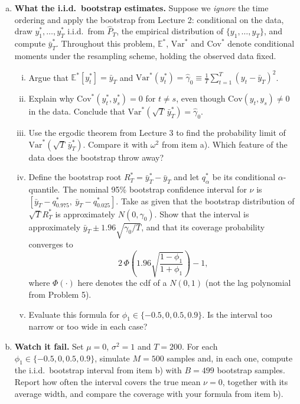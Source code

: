 \documentclass[11pt]{article}
\theoremstyle{definition}
\newcommand{\E}{\mathbb{E}}
\newcommand{\Var}{\mathrm{Var}}
\newcounter{problem}
\begin{document}
\begin{enumerate}[a)]
	\item \textbf{What the i.i.d.\ bootstrap estimates.} Suppose we \textit{ignore} the time ordering and apply the bootstrap from Lecture 2: conditional on the data, draw $y^*_1, \dots, y^*_T$ i.i.d.\ from $\hat{P}_T$, the empirical distribution of $\{y_1, \dots, y_T\}$, and compute $\bar{y}^*_T$. Throughout this problem, $\E^*$, $\Var^*$ and $\mathrm{Cov}^*$ denote conditional moments under the resampling scheme, holding the observed data fixed.
	\begin{enumerate}[(i)]
		\item Argue that $\E^*[y^*_t] = \bar{y}_T$ and $\Var^*(y^*_t) = \hat{\gamma}_0 \equiv \frac{1}{T}\sum_{t=1}^T (y_t - \bar{y}_T)^2$.
		\item Explain why $\mathrm{Cov}^*(y^*_t, y^*_s) = 0$ for $t \neq s$, even though $\mathrm{Cov}(y_t, y_s) \neq 0$ in the data. Conclude that $\Var^*(\sqrt{T}\,\bar{y}^*_T) = \hat{\gamma}_0$.
		\item Use the ergodic theorem from Lecture 3 to find the probability limit of $\Var^*(\sqrt{T}\,\bar{y}^*_T)$. Compare it with $\omega^2$ from item a). Which feature of the data does the bootstrap throw away?
		\item Define the bootstrap root $R_T^* = \bar{y}_T^* - \bar{y}_T$ and let $q_\alpha^*$ be its conditional $\alpha$-quantile. The nominal 95\% bootstrap confidence interval for $\nu$ is $\left[\bar{y}_T - q_{0.975}^*,\ \bar{y}_T - q_{0.025}^*\right]$. Take as given that the bootstrap distribution of $\sqrt{T}R_T^*$ is approximately $N(0, \gamma_0)$. Show that the interval is approximately $\bar{y}_T \pm 1.96\sqrt{\gamma_0/T}$, and that its coverage probability converges to
		\begin{equation*}
			2\,\Phi\left(1.96\sqrt{\frac{1-\phi_1}{1+\phi_1}}\right) - 1,
		\end{equation*}
		where $\Phi(\cdot)$ here denotes the cdf of a $N(0, 1)$ (not the lag polynomial from Problem 5).
		\item Evaluate this formula for $\phi_1 \in \{-0.5, 0, 0.5, 0.9\}$. Is the interval too narrow or too wide in each case?
	\end{enumerate}

	\item \textbf{Watch it fail.} Set $\mu = 0$, $\sigma^2 = 1$ and $T = 200$. For each $\phi_1 \in \{-0.5, 0, 0.5, 0.9\}$, simulate $M = 500$ samples and, in each one, compute the i.i.d.\ bootstrap interval from item b) with $B = 499$ bootstrap samples. Report how often the interval covers the true mean $\nu = 0$, together with its average width, and compare the coverage with your formula from item b).


\end{enumerate}
\end{document}
